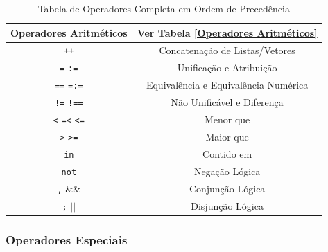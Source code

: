 
\begin{frame}[fragile]
	\begin{table}
		\caption{Tabela de Operadores Completa em Ordem de Precedência}
		\begin{center}
			\begin{tabular}{ c|c } \hline
				Operadores Aritméticos & Ver Tabela \ref{Operadores Aritméticos}\\ \hline
				\verb-++-  & Concatenação de Listas/Vetores \\ \hline 
				\verb+=+  \verb+:=+  & Unificação e Atribuição\\ \hline
				\verb+==+ \verb+=:=+ & Equivalência e Equivalência Numérica\\ \hline
				\verb+!=+ \verb+!==+ & Não Unificável e Diferença\\ \hline
				\verb+<+  \verb+=<+ \verb+<=+ & Menor que\\ \hline
				\verb+>+  \verb+>=+ & Maior que\\ \hline
				\verb+in+ & Contido em\\ \hline
				\verb+not+ & Negação Lógica \\ \hline 
				\verb+,+  $\&\&$ & Conjunção Lógica \\ \hline 
				\verb+;+  $|$$|$ & Disjunção Lógica \\ \hline 
			\end{tabular}
		\end{center}
	\end{table}
\end{frame}


\subsubsection{Operadores Especiais}

